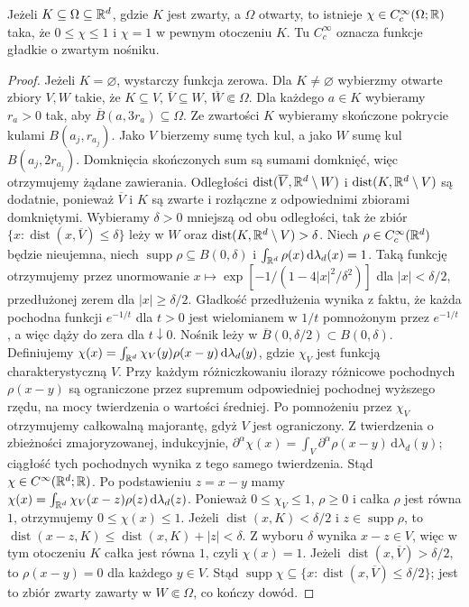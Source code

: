 \begin{lemat}
\label{lem:cutoffs17}
Jeżeli $K\subseteq\Omega\subseteq\mathbb R^d$, gdzie $K$ jest zwarty,
a $\Omega$ otwarty, to istnieje $\chi\in C_c^\infty(\Omega;\mathbb R)$
taka, że $0\le\chi\le1$ i $\chi=1$ w pewnym otoczeniu $K$.
Tu $C_c^\infty$ oznacza funkcje gładkie o zwartym nośniku.
\end{lemat}
\begin{proof}
Jeżeli $K=\varnothing$, wystarczy funkcja zerowa.
Dla $K\ne\varnothing$ wybierzmy otwarte zbiory $V,W$ takie, że
$K\subseteq V$, $\overline V\subseteq W$, $\overline W\Subset\Omega$.
Dla każdego $a\in K$ wybieramy $r_a>0$ tak,
aby $\overline B(a,3r_a)\subseteq\Omega$. Ze zwartości $K$
wybieramy skończone pokrycie kulami $B(a_j,r_{a_j})$.
Jako $V$ bierzemy sumę tych kul, a jako $W$ sumę kul
$B(a_j,2r_{a_j})$. Domknięcia skończonych sum są sumami
domknięć, więc otrzymujemy żądane zawierania.
Odległości $\operatorname{dist}(\overline V,\mathbb R^d\setminus W)$
i $\operatorname{dist}(K,\mathbb R^d\setminus V)$ są dodatnie,
ponieważ $\overline V$ i $K$ są zwarte
i rozłączne z odpowiednimi zbiorami domkniętymi.
Wybieramy $\delta>0$ mniejszą od obu odległości, tak że zbiór
$\{x:\operatorname{dist}(x,\overline V)\le\delta\}$
leży w $W$ oraz $\operatorname{dist}(K,\mathbb R^d\setminus V)>\delta$.
Niech $\rho\in C_c^\infty(\mathbb R^d)$ będzie nieujemna,
niech $\operatorname{supp}\rho\subseteq B(0,\delta)$ i
$\int_{\mathbb R^d}\rho(x)\,\mathrm d\lambda_d(x)=1$.
Taką funkcję otrzymujemy przez unormowanie
$x\mapsto\exp[-1/(1-4|x|^2/\delta^2)]$ dla $|x|<\delta/2$,
przedłużonej zerem dla $|x|\ge\delta/2$.
Gładkość przedłużenia wynika z faktu, że każda pochodna
funkcji $e^{-1/t}$ dla $t>0$ jest wielomianem w $1/t$
pomnożonym przez $e^{-1/t}$, a więc dąży do zera dla $t\downarrow0$.
Nośnik leży w $\overline B(0,\delta/2)\subset B(0,\delta)$.
Definiujemy $\chi(x)=\int_{\mathbb R^d}\chi_V(y)\rho(x-y)\,\mathrm d\lambda_d(y)$,
gdzie $\chi_V$ jest funkcją charakterystyczną $V$.
Przy każdym różniczkowaniu ilorazy różnicowe pochodnych
$\rho(x-y)$ są ograniczone przez supremum odpowiedniej
pochodnej wyższego rzędu, na mocy twierdzenia o wartości średniej.
Po pomnożeniu przez $\chi_V$ otrzymujemy całkowalną majorantę,
gdyż $V$ jest ograniczony. Z twierdzenia o zbieżności
zmajoryzowanej, indukcyjnie,
$\partial^\alpha\chi(x)=\int_V\partial^\alpha\rho(x-y)\,\mathrm d\lambda_d(y)$;
ciągłość tych pochodnych wynika z tego samego twierdzenia.
Stąd $\chi\in C^\infty(\mathbb R^d;\mathbb R)$.
Po podstawieniu $z=x-y$ mamy
$\chi(x)=\int_{\mathbb R^d}\chi_V(x-z)\rho(z)\,\mathrm d\lambda_d(z)$.
Ponieważ $0\le\chi_V\le1$, $\rho\ge0$ i całka $\rho$ jest równa $1$,
otrzymujemy $0\le\chi(x)\le1$.
Jeżeli $\operatorname{dist}(x,K)<\delta/2$ i
$z\in\operatorname{supp}\rho$, to
$\operatorname{dist}(x-z,K)\le\operatorname{dist}(x,K)+|z|<\delta$.
Z wyboru $\delta$ wynika $x-z\in V$, więc w tym otoczeniu
$K$ całka jest równa $1$, czyli $\chi(x)=1$. Jeżeli $\operatorname{dist}(x,\overline V)>\delta/2$,
to $\rho(x-y)=0$ dla każdego $y\in V$.
Stąd $\operatorname{supp}\chi\subseteq
\{x:\operatorname{dist}(x,\overline V)\le\delta/2\}$;
jest to zbiór zwarty zawarty w $W\Subset\Omega$,
co kończy dowód.
\end{proof}

